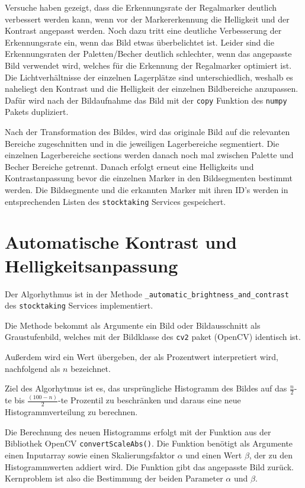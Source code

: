     Versuche haben gezeigt, dass die Erkennungsrate der Regalmarker deutlich verbessert werden kann, wenn vor der Markererkennung die Helligkeit und der Kontrast angepasst werden. 
    Noch dazu tritt eine deutliche Verbesserung der Erkennungsrate ein, wenn das Bild etwas überbelichtet ist. 
    Leider sind die Erkennungsraten der Paletten/Becher deutlich schlechter, wenn das angepasste Bild verwendet wird, welches für die Erkennung der Regalmarker optimiert ist. 
    Die Lichtverhältnisse der einzelnen Lagerplätze sind unterschiedlich, weshalb es naheliegt den Kontrast und die Helligkeit der einzelnen Bildbereiche anzupassen. 
    Dafür wird nach der Bildaufnahme das Bild mit der \verb|copy| Funktion des \verb|numpy| Pakets dupliziert.

    Nach der Transformation des Bildes, wird das originale Bild auf die relevanten Bereiche zugeschnitten und in die jeweiligen Lagerbereiche segmentiert.
    Die einzelnen Lagerbereiche \glqq sections \grqq werden danach noch mal zwischen Palette und Becher Bereiche getrennt. 
    Danach erfolgt erneut eine Helligkeits und Kontrastanpassung bevor die einzelnen Marker in den Bildsegmenten bestimmt werden. 
    Die Bildsegmente und die erkannten Marker mit ihren ID's werden in entsprechenden Listen des \verb|stocktaking| Services gespeichert.

    \section {Automatische Kontrast und Helligkeitsanpassung}
    Der Algorhythmus ist in der Methode \verb|_automatic_brightness_and_contrast| des \verb|stocktaking| Services implementiert. 

    Die Methode bekommt als Argumente ein Bild oder Bildausschnitt als Graustufenbild, welches mit der Bildklasse des \verb|cv2| paket (OpenCV) identisch ist. 

    Außerdem wird ein Wert übergeben, der als Prozentwert interpretiert wird, nachfolgend als $n$ bezeichnet.
    
    Ziel des Algorhytmus ist es, das ursprüngliche Histogramm des Bildes auf das $\frac{n}{2}$-te bis $\frac{(100-n)}{2}$-te Prozentil zu beschränken und
    daraus eine neue Histogrammverteilung zu berechnen. 

    Die Berechnung des neuen Histogramms erfolgt mit der Funktion aus der Bibliothek OpenCV \verb|convertScaleAbs()|. 
    Die Funktion benötigt als Argumente einen Inputarray sowie einen Skalierungsfaktor $\alpha$ und einen Wert $\beta$, der zu den Histogrammwerten addiert wird.
    Die Funktion gibt das angepasste Bild zurück.
    Kernproblem ist also die Bestimmung der beiden Parameter $\alpha$ und $\beta$. 

